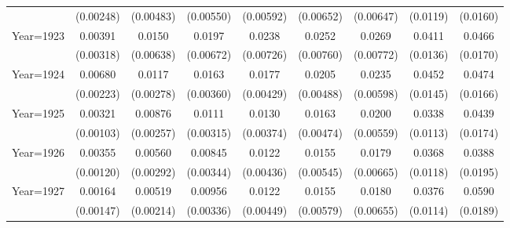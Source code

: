 \begin{table}[htbp]
\begin{tabular}{l*{8}{c}}
                    &   (0.00248)         &   (0.00483)         &   (0.00550)         &   (0.00592)         &   (0.00652)         &   (0.00647)         &    (0.0119)         &    (0.0160)         \\
[1em]
Year=1923           &     0.00391         &      0.0150\sym{**} &      0.0197\sym{***}&      0.0238\sym{***}&      0.0252\sym{***}&      0.0269\sym{***}&      0.0411\sym{***}&      0.0466\sym{***}\\
                    &   (0.00318)         &   (0.00638)         &   (0.00672)         &   (0.00726)         &   (0.00760)         &   (0.00772)         &    (0.0136)         &    (0.0170)         \\
[1em]
Year=1924           &     0.00680\sym{***}&      0.0117\sym{***}&      0.0163\sym{***}&      0.0177\sym{***}&      0.0205\sym{***}&      0.0235\sym{***}&      0.0452\sym{***}&      0.0474\sym{***}\\
                    &   (0.00223)         &   (0.00278)         &   (0.00360)         &   (0.00429)         &   (0.00488)         &   (0.00598)         &    (0.0145)         &    (0.0166)         \\
[1em]
Year=1925           &     0.00321\sym{***}&     0.00876\sym{***}&      0.0111\sym{***}&      0.0130\sym{***}&      0.0163\sym{***}&      0.0200\sym{***}&      0.0338\sym{***}&      0.0439\sym{**} \\
                    &   (0.00103)         &   (0.00257)         &   (0.00315)         &   (0.00374)         &   (0.00474)         &   (0.00559)         &    (0.0113)         &    (0.0174)         \\
[1em]
Year=1926           &     0.00355\sym{***}&     0.00560\sym{*}  &     0.00845\sym{**} &      0.0122\sym{***}&      0.0155\sym{***}&      0.0179\sym{***}&      0.0368\sym{***}&      0.0388\sym{**} \\
                    &   (0.00120)         &   (0.00292)         &   (0.00344)         &   (0.00436)         &   (0.00545)         &   (0.00665)         &    (0.0118)         &    (0.0195)         \\
[1em]
Year=1927           &     0.00164         &     0.00519\sym{**} &     0.00956\sym{***}&      0.0122\sym{***}&      0.0155\sym{***}&      0.0180\sym{***}&      0.0376\sym{***}&      0.0590\sym{***}\\
                    &   (0.00147)         &   (0.00214)         &   (0.00336)         &   (0.00449)         &   (0.00579)         &   (0.00655)         &    (0.0114)         &    (0.0189)         \\

\end{tabular}
\end{table}
